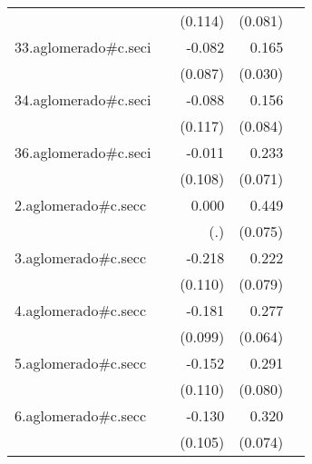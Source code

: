 {\begin{longtable}{l*{4}{D{.}{.}{-1}}}
            &                     &     (0.114)         &     (0.081)         &                     \\
\addlinespace
33.aglomerado#c.seci&                     &      -0.082         &       0.165\sym{***}&                     \\
            &                     &     (0.087)         &     (0.030)         &                     \\
\addlinespace
34.aglomerado#c.seci&                     &      -0.088         &       0.156         &                     \\
            &                     &     (0.117)         &     (0.084)         &                     \\
\addlinespace
36.aglomerado#c.seci&                     &      -0.011         &       0.233\sym{***}&                     \\
            &                     &     (0.108)         &     (0.071)         &                     \\
\addlinespace
2.aglomerado#c.secc&                     &       0.000         &       0.449\sym{***}&                     \\
            &                     &         (.)         &     (0.075)         &                     \\
\addlinespace
3.aglomerado#c.secc&                     &      -0.218\sym{*}  &       0.222\sym{**} &                     \\
            &                     &     (0.110)         &     (0.079)         &                     \\
\addlinespace
4.aglomerado#c.secc&                     &      -0.181         &       0.277\sym{***}&                     \\
            &                     &     (0.099)         &     (0.064)         &                     \\
\addlinespace
5.aglomerado#c.secc&                     &      -0.152         &       0.291\sym{***}&                     \\
            &                     &     (0.110)         &     (0.080)         &                     \\
\addlinespace
6.aglomerado#c.secc&                     &      -0.130         &       0.320\sym{***}&                     \\
            &                     &     (0.105)         &     (0.074)         &                     \\

\end{longtable}}
